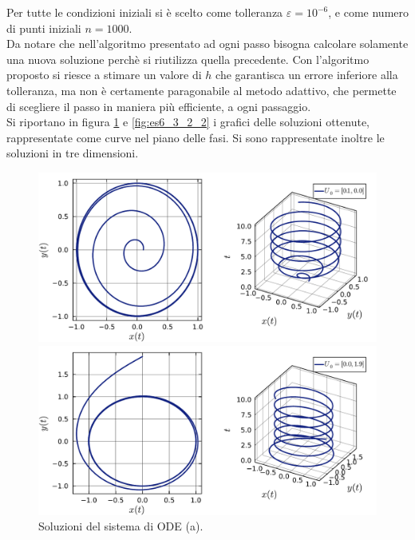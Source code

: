 \documentclass[letterpaper, 12pt]{article}
\numberwithin{equation}{section}    %
\begin{document}
Per tutte le condizioni iniziali si è scelto come tolleranza $\varepsilon = 10^{-6}$, e come numero di punti iniziali
$n = 1000$. \\
Da notare che nell'algoritmo presentato ad ogni passo bisogna calcolare solamente una nuova soluzione perchè si 
riutilizza quella precedente. Con l'algoritmo proposto si riesce a stimare un valore di $h$ che garantisca
un errore inferiore alla tolleranza, ma non è certamente paragonabile al metodo adattivo, che permette 
di scegliere il passo in maniera più efficiente, a ogni passaggio. \\
Si riportano in figura \ref{fig:es6_3_2_1} e \ref{fig:es6_3_2_2} i grafici delle soluzioni ottenute,
rappresentate come curve nel piano delle fasi. Si sono rappresentate inoltre le 
soluzioni in tre dimensioni.
\begin{figure}[!ht]
    \centering
    \begin{minipage}[b]{0.47\textwidth}
        \includegraphics[width=\textwidth]{632A1.pdf}
    \end{minipage}
    \hspace{0.5cm}
    \begin{minipage}[b]{0.47\textwidth}
        \includegraphics[width=\textwidth]{632A2.pdf}
    \end{minipage}
    \caption{Soluzioni del sistema di ODE (a).}
    \label{fig:es6_3_2_1}
\end{figure}
\end{document}
